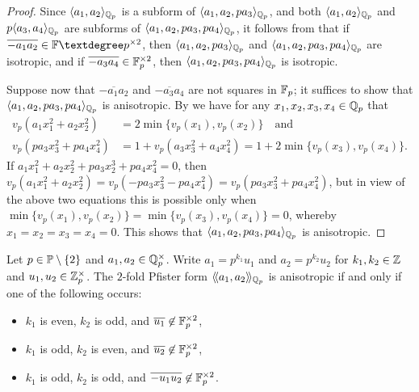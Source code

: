 \documentclass[12pt, leqno, british]{amsart}
\begin{document}
\begin{proof}
Since $\langle a_1, a_2 \rangle_{\mathbb Q_p}$ is a subform of $\langle a_1, a_2, pa_3 \rangle_{\mathbb Q_p}$, and both $\langle a_1, a_2 \rangle_{\mathbb Q_p}$ and $p\langle a_3, a_4 \rangle_{\mathbb Q_p}$ are subforms of $\langle a_1, a_2, pa_3, pa_4 \rangle_{\mathbb Q_p}$, it follows from  that if $\overline{-a_1a_2} \in \ff°p^{\times 2}$, then $\langle a_1, a_2, pa_3 \rangle_{\mathbb Q_p}$ and $\langle a_1, a_2, pa_3, pa_4 \rangle_{\mathbb Q_p}$ are isotropic, and if $\overline{-a_3a_4} \in \mathbb F_p^{\times 2}$, then $\langle a_1, a_2, pa_3, pa_4 \rangle_{\mathbb Q_p}$ is isotropic.

Suppose now that $\overline{-a_1a_2}$ and $\overline{-a_3a_4}$ are not squares in $\mathbb F_p$; it suffices to show that $\langle a_1, a_2, pa_3, pa_4 \rangle_{\mathbb Q_p}$ is anisotropic.
By  we have for any $x_1, x_2, x_3, x_4 \in \mathbb Q_p$ that
\begin{align*}
v_p(a_1x_1^2 + a_2x_2^2) &= 2\min \lbrace v_p(x_1), v_p(x_2) \rbrace \quad \text{and}\\ 
v_p(pa_3x_3^2 + pa_4x_4^2) &= 1 + v_p(a_3x_3^2 + a_4x_4^2) = 1 + 2\min \lbrace v_p(x_3), v_p(x_4) \rbrace.
\end{align*}
If $a_1x_1^2 + a_2x_2^2 + pa_3x_2^3 + pa_4x_4^2 = 0$, then $v_p(a_1x_1^2 + a_2x_2^2) = v_p(-pa_3x_3^2 - pa_4x_4^2) = v_p(pa_3x_3^2 + pa_4x_4^2)$, but in view of the above two equations this is possible only when
$\min \lbrace v_p(x_1), v_p(x_2) \rbrace = \min \lbrace v_p(x_3), v_p(x_4) \rbrace = 0$, whereby $x_1 = x_2 = x_3 = x_4 = 0$.
This shows that $\langle a_1, a_2, pa_3, pa_4 \rangle_{\mathbb Q_p}$ is anisotropic.
\end{proof}
\begin{prop}\label{P:2-fold-Pfister-qqp-odd}
Let $p \in \mathbb P \setminus \lbrace 2 \rbrace$ and $a_1, a_2 \in \mathbb Q_p^ \times$.
Write $a_1 = p^{k_1}u_1$ and $a_2 = p^{k_2}u_2$ for $k_1, k_2 \in \mathbb Z$ and $u_1, u_2 \in \mathbb Z_p^\times$.
The $2$-fold Pfister form $\langle\!\langle a_1, a_2 \rangle\!\rangle_{\mathbb Q_p}$ is anisotropic if and only if one of the following occurs:
\begin{itemize}
\item $k_1$ is even, $k_2$ is odd, and $\overline{u_1} \not\in \mathbb F_p^{\times 2}$,
\item $k_1$ is odd, $k_2$ is even, and $\overline{u_2} \not\in \mathbb F_p^{\times 2}$,
\item $k_1$ is odd, $k_2$ is odd, and $\overline{-u_1u_2} \not\in \mathbb F_p^{\times 2}$.
\end{itemize}
\end{prop}
\end{document}
